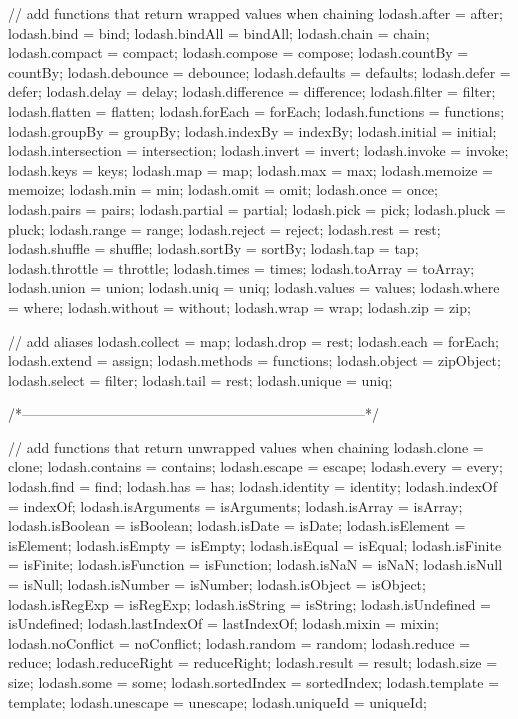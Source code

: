 \begin{DoxyCodeInclude}
{{  \textcolor{comment}{// add functions that return wrapped values when chaining}
  lodash.after = after;
  lodash.bind = bind;
  lodash.bindAll = bindAll;
  lodash.chain = chain;
  lodash.compact = compact;
  lodash.compose = compose;
  lodash.countBy = countBy;
  lodash.debounce = debounce;
  lodash.defaults = defaults;
  lodash.defer = defer;
  lodash.delay = delay;
  lodash.difference = difference;
  lodash.filter = filter;
  lodash.flatten = flatten;
  lodash.forEach = forEach;
  lodash.functions = functions;
  lodash.groupBy = groupBy;
  lodash.indexBy = indexBy;
  lodash.initial = initial;
  lodash.intersection = intersection;
  lodash.invert = invert;
  lodash.invoke = invoke;
  lodash.keys = keys;
  lodash.map = map;
  lodash.max = max;
  lodash.memoize = memoize;
  lodash.min = min;
  lodash.omit = omit;
  lodash.once = once;
  lodash.pairs = pairs;
  lodash.partial = partial;
  lodash.pick = pick;
  lodash.pluck = pluck;
  lodash.range = range;
  lodash.reject = reject;
  lodash.rest = rest;
  lodash.shuffle = shuffle;
  lodash.sortBy = sortBy;
  lodash.tap = tap;
  lodash.throttle = throttle;
  lodash.times = times;
  lodash.toArray = toArray;
  lodash.union = \textcolor{keyword}{union};
  lodash.uniq = uniq;
  lodash.values = values;
  lodash.where = where;
  lodash.without = without;
  lodash.wrap = wrap;
  lodash.zip = zip;

  \textcolor{comment}{// add aliases}
  lodash.collect = map;
  lodash.drop = rest;
  lodash.each = forEach;
  lodash.extend = assign;
  lodash.methods = functions;
  lodash.object = zipObject;
  lodash.select = filter;
  lodash.tail = rest;
  lodash.unique = uniq;

  \textcolor{comment}{/*--------------------------------------------------------------------------*/}

  \textcolor{comment}{// add functions that return unwrapped values when chaining}
  lodash.clone = clone;
  lodash.contains = contains;
  lodash.escape = escape;
  lodash.every = every;
  lodash.find = find;
  lodash.has = has;
  lodash.identity = identity;
  lodash.indexOf = indexOf;
  lodash.isArguments = isArguments;
  lodash.isArray = isArray;
  lodash.isBoolean = isBoolean;
  lodash.isDate = isDate;
  lodash.isElement = isElement;
  lodash.isEmpty = isEmpty;
  lodash.isEqual = isEqual;
  lodash.isFinite = isFinite;
  lodash.isFunction = isFunction;
  lodash.isNaN = isNaN;
  lodash.isNull = isNull;
  lodash.isNumber = isNumber;
  lodash.isObject = isObject;
  lodash.isRegExp = isRegExp;
  lodash.isString = isString;
  lodash.isUndefined = isUndefined;
  lodash.lastIndexOf = lastIndexOf;
  lodash.mixin = mixin;
  lodash.noConflict = noConflict;
  lodash.random = random;
  lodash.reduce = reduce;
  lodash.reduceRight = reduceRight;
  lodash.result = result;
  lodash.size = size;
  lodash.some = some;
  lodash.sortedIndex = sortedIndex;
  lodash.template = \textcolor{keyword}{template};
  lodash.unescape = unescape;
  lodash.uniqueId = uniqueId;

}}
\end{DoxyCodeInclude}
